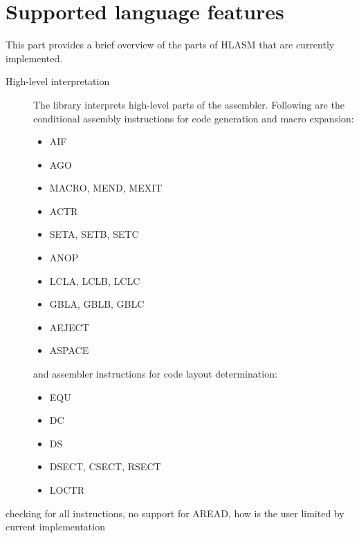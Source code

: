 \chapter{Supported language features}
\label{LSPFeatures}
This part provides a brief overview of the parts of HLASM that are currently implemented.

\begin{description}
	\item [High-level interpretation] The library interprets high-level parts of the assembler. Following are the conditional assembly instructions for code generation and macro expansion:
	\begin{itemize}
		\item AIF
		\item AGO
		\item MACRO, MEND, MEXIT
		\item ACTR
		\item SETA, SETB, SETC
		\item ANOP
		\item LCLA, LCLB, LCLC
		\item GBLA, GBLB, GBLC
		\item AEJECT
		\item ASPACE
	\end{itemize}
	and assembler instructions for code layout determination:
	\begin{itemize}
		\item EQU 
		\item DC 
		\item DS 
		\item DSECT, CSECT, RSECT 
		\item LOCTR
	\end{itemize}
\end{description}

checking for all instructions, no support for AREAD, how is the user limited by current implementation

